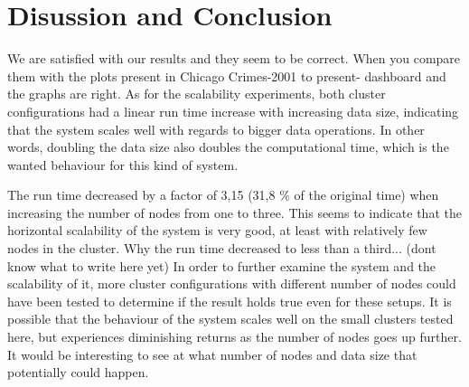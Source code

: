 \section{Disussion and Conclusion}


We are satisfied with our results and they seem to be correct. When you compare them with the plots present in Chicago Crimes-2001 to present- dashboard \cite{chicago_location} and the graphs are right.
\bigbreak
As for the scalability experiments, both cluster configurations had a linear run time increase with increasing data size, indicating that the system scales well with regards to bigger data operations. In other words, doubling the data size also doubles the computational time, which is the wanted behaviour for this kind of system.

The run time decreased by a factor of 3,15 (31,8 \% of the original time) when increasing the number of nodes from one to three. This seems to indicate that the horizontal scalability of the system is very good, at least with relatively few nodes in the cluster. Why the run time decreased to less than a third... (dont know what to write here yet)
\bigbreak
In order to further examine the system and the scalability of it, more cluster configurations with different number of nodes could have been tested to determine if the result holds true even for these setups. It is possible that the behaviour of the system scales well on the small clusters tested here, but experiences diminishing returns as the number of nodes goes up further. It would be interesting to see at what number of nodes and data size that potentially could happen. 